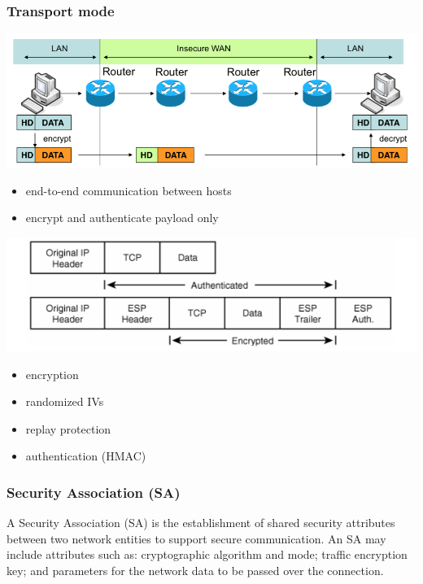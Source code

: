 \documentclass[fs, footer]{latex4ei}
\begin{document}
\begin{multicols*}{4}
{\subsubsection{Transport mode}
\includegraphics[width=\columnwidth]{img/vpntransport.png}
\begin{itemize}
	\item end-to-end communication between hosts
	\item encrypt and authenticate payload only
\end{itemize}
\includegraphics[width=\columnwidth]{img/vpntransport2.png}

\begin{itemize}
	\item encryption
	\item randomized IVs
	\item replay protection
	\item authentication (HMAC)
\end{itemize}

\subsubsection{Security Association (SA)}
A Security Association (SA) is the establishment of shared security attributes between two network entities to support secure communication. An SA may include attributes such as: cryptographic algorithm and mode; traffic encryption key; and parameters for the network data to be passed over the connection.
} 
\end{multicols*}
\end{document}
